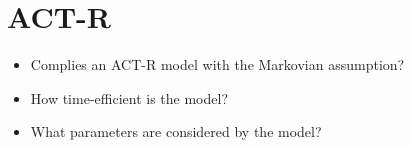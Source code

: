 \chapter*{ACT-R}
\label{sec:algorithm}

\begin{itemize}
    \item Complies an ACT-R model with the Markovian assumption?
    \item How time-efficient is the model?
    \item What parameters are considered by the model?
\end{itemize}
